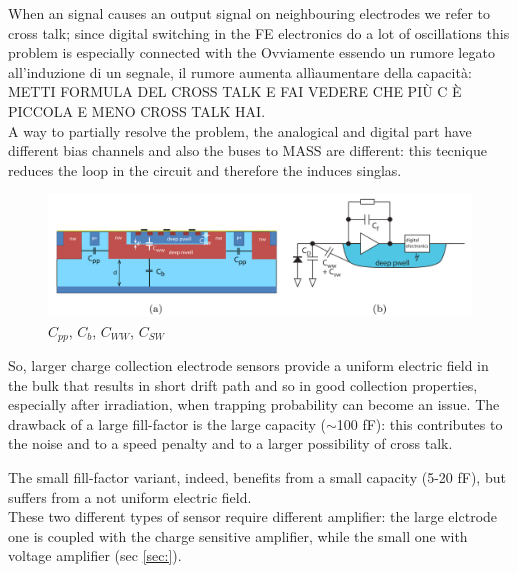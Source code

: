 When an signal causes an output signal on neighbouring electrodes we refer to cross talk; since digital switching in the FE electronics do a lot of oscillations this problem is especially connected with the
Ovviamente essendo un rumore legato all'induzione di un segnale, il rumore aumenta allìaumentare della capacità:
METTI FORMULA DEL CROSS TALK E FAI VEDERE CHE PIÙ C È PICCOLA E MENO CROSS TALK HAI.\\
A way to partially resolve the problem, the analogical and digital part have different bias channels and also the buses to MASS are different: this tecnique reduces the loop in the circuit and therefore the induces singlas.\\


\begin{figure}[h!]
   \centering\includegraphics[width=12cm]{figures/DMAPS_capacity.png}
   \caption{$C_{pp}$, $C_{b}$, $C_{WW}$, $C_{SW}$}
   \label{fig:DMAPS_capacity}
\end{figure}
So, larger charge collection electrode sensors provide a uniform electric field in the bulk that results in short drift path and so in good collection properties, especially after irradiation, when trapping probability can become an issue. The drawback of a large fill-factor is the large capacity ($\sim$100 fF): this contributes to the noise and to a speed penalty and to a larger possibility of cross talk.

The small fill-factor variant, indeed, benefits from a small capacity (5-20 fF), but suffers from a not uniform electric field. \\
These two different types of sensor require different amplifier: the large elctrode one is coupled with the charge sensitive amplifier, while the small one with voltage amplifier (sec \ref{sec:}).

